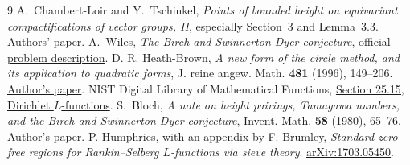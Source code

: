 \documentclass[11pt]{article}
\begin{document}
\begin{thebibliography}{9}
A.~Chambert-Loir and Y.~Tschinkel,
\emph{Points of bounded height on equivariant compactifications of vector
groups, II}, especially Section~3 and Lemma~3.3.
\href{https://arxiv.org/abs/math/9904008}{Authors' paper}.
A.~Wiles, \emph{The Birch and Swinnerton-Dyer conjecture},
\href{https://www.claymath.org/wp-content/uploads/2022/05/birchswin.pdf}{official problem description}.
D. R. Heath-Brown, \emph{A new form of the circle method, and its
application to quadratic forms}, J. reine angew. Math. \textbf{481}
(1996), 149--206. \href{https://ora.ox.ac.uk/objects/uuid%3Abbd3c62f-f010-44b5-8be5-87e903fb0084}{Author's paper}.
NIST Digital Library of Mathematical Functions,
\href{https://dlmf.nist.gov/25.15}{Section 25.15, Dirichlet $L$-functions}.
S.~Bloch, \emph{A note on height pairings, Tamagawa numbers,
and the Birch and Swinnerton-Dyer conjecture}, Invent. Math.
\textbf{58} (1980), 65--76.
\href{https://virtualmath1.stanford.edu/~conrad/BSDseminar/refs/BlochBSD.pdf}{Author's paper}.
P. Humphries, with an appendix by F. Brumley,
\emph{Standard zero-free regions for Rankin--Selberg $L$-functions
via sieve theory}. \href{https://arxiv.org/abs/1703.05450}{arXiv:1703.05450}.
\end{thebibliography}
\end{document}
